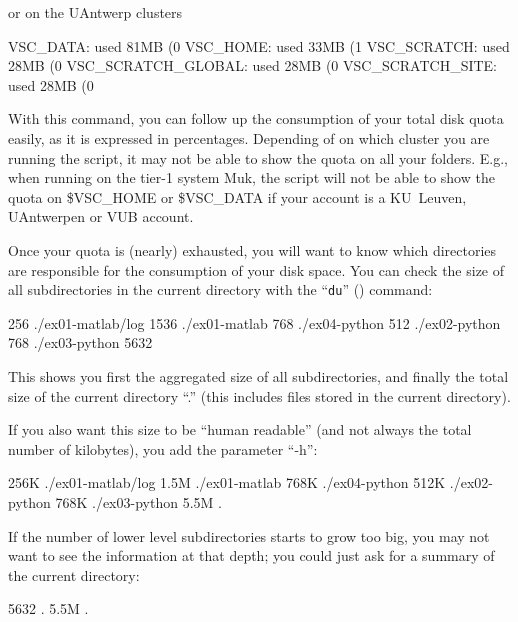 or on the UAntwerp clusters

\begin{prompt}
VSC_DATA:    used 81MB (0%
VSC_HOME:    used 33MB (1%
VSC_SCRATCH:   used 28MB (0%
VSC_SCRATCH_GLOBAL: used 28MB (0%
VSC_SCRATCH_SITE:   used 28MB (0%
\end{prompt}


With this command, you can follow up the consumption of your total disk quota
easily, as it is expressed in percentages. Depending of on which cluster you are
running the script, it may not be able to show the quota on all your folders.
E.g., when running on the tier-1 system Muk, the script will not be able to show
the quota on \$VSC\_HOME or \$VSC\_DATA if your account is a KU~Leuven, UAntwerpen or VUB account.

Once your quota is (nearly) exhausted, you will want to know which directories
are responsible for the consumption of your disk space. You can check the size
of all subdirectories in the current directory with the ``\texttt{du}'' () command:

\begin{prompt}
256 ./ex01-matlab/log
1536 ./ex01-matlab
768 ./ex04-python
512 ./ex02-python
768 ./ex03-python
5632
\end{prompt}

This shows you first the aggregated size of all subdirectories, and finally the
total size of the current directory ``.'' (this includes files stored in the
current directory).

If you also want this size to be ``human readable'' (and not always the total
number of kilobytes), you add the parameter ``-h'':

\begin{prompt}
256K ./ex01-matlab/log
1.5M ./ex01-matlab
768K ./ex04-python
512K ./ex02-python
768K ./ex03-python
5.5M .
\end{prompt}

If the number of lower level subdirectories starts to grow too big, you may not
want to see the information at that depth; you could just ask for a summary of
the current directory:

\begin{prompt}
5632 .
5.5M .
\end{prompt}

